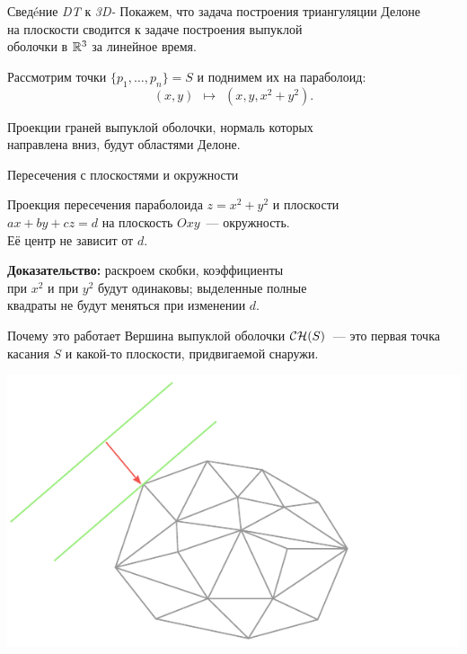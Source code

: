 \documentclass[12pt,aspectratio=169,svgnames]{beamer}
\begin{document}
\begin{frame}{Сведéние {\it DT} к {\it 3D-\CH}}
	Покажем, что задача построения триангуляции Делоне \\
	на плоскости сводится к задаче построения выпуклой \\
	оболочки в \(\mathbb{R}^3\) за линейное время.

	Рассмотрим точки \(\{p_1, \ldots, p_n\} = S\) и поднимем их на параболоид:
	\[(x,y)\ \ \mapsto\ \ (x,y,x^2+y^2).\] \smallskip

\begin{thm}
	Проекции граней выпуклой оболочки, нормаль которых \\
	направлена вниз, будут областями Делоне.
\end{thm}
\end{frame}


\begin{frame}{Пересечения с плоскостями и окружности}
\begin{lm}
	Проекция пересечения параболоида \(z = x^2 + y^2\) и плоскости \\
	\(ax+by+cz=d\) на плоскость \(Oxy\)~— окружность. \\
	Её центр не зависит от \(d\).
\end{lm} \medskip

	{\bf Доказательство:} раскроем скобки, коэффициенты \\
	при \(x^2\) и при \(y^2\) будут одинаковы; выделенные полные \\
	квадраты не будут меняться при изменении \(d\).
\end{frame}


\begin{frame}{Почему это работает}
	Вершина выпуклой оболочки \(\mathcal{C}\mathcal{H}(S)\)~— это первая точка \\
	касания \(S\) и какой-то плоскости, придвигаемой снаружи.
\begin{center} \includegraphics[scale=0.85]{svg/firstTangent} \end{center}
\end{frame}
\end{document}
